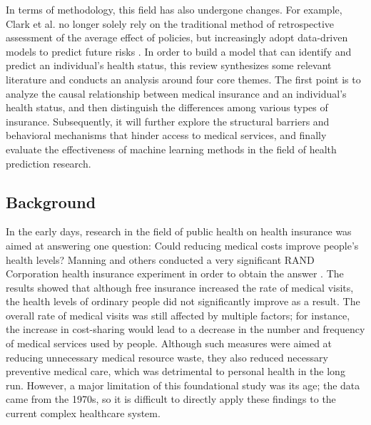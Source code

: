 In terms of methodology, this field has also undergone changes. For example, Clark et al. no longer solely rely on the traditional method of retrospective assessment of the average effect of policies, but increasingly adopt data-driven models to predict future risks \cite{Clark_Ommerborn_Moran_Brooks_Haas_Bates_Wright_2021}. In order to build a model that can identify and predict an individual's health status, this review synthesizes some relevant literature and conducts an analysis around four core themes. The first point is to analyze the causal relationship between medical insurance and an individual's health status, and then distinguish the differences among various types of insurance. Subsequently, it will further explore the structural barriers and behavioral mechanisms that hinder access to medical services, and finally evaluate the effectiveness of machine learning methods in the field of health prediction research.

\subsection{Background}

In the early days, research in the field of public health on health insurance was aimed at answering one question: Could reducing medical costs improve people's health levels? Manning and others conducted a very significant RAND Corporation health insurance experiment in order to obtain the answer \cite{Manning1987Health}. The results showed that although free insurance increased the rate of medical visits, the health levels of ordinary people did not significantly improve as a result. The overall rate of medical visits was still affected by multiple factors; for instance, the increase in cost-sharing would lead to a decrease in the number and frequency of medical services used by people. Although such measures were aimed at reducing unnecessary medical resource waste, they also reduced necessary preventive medical care, which was detrimental to personal health in the long run. However, a major limitation of this foundational study was its age; the data came from the 1970s, so it is difficult to directly apply these findings to the current complex healthcare system.

